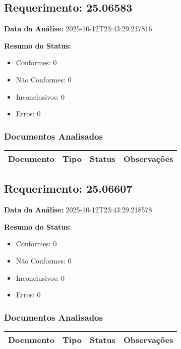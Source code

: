 \documentclass[12pt,a4paper]{article}
\begin{document}
\subsection{Requerimento: 25.06583}

\textbf{Data da Análise:} 2025-10-12T23:43:29.217816

\textbf{Resumo do Status:}
\begin{itemize}
    \item Conformes: 0
    \item Não Conformes: 0
    \item Inconclusivos: 0
    \item Erros: 0
\end{itemize}

\subsubsection{Documentos Analisados}

\begin{longtable}{|p{4cm}|p{2cm}|p{2cm}|p{6cm}|}
\hline
\textbf{Documento} & \textbf{Tipo} & \textbf{Status} & \textbf{Observações} \\
\hline
\endhead
\end{longtable}


\subsection{Requerimento: 25.06607}

\textbf{Data da Análise:} 2025-10-12T23:43:29.218578

\textbf{Resumo do Status:}
\begin{itemize}
    \item Conformes: 0
    \item Não Conformes: 0
    \item Inconclusivos: 0
    \item Erros: 0
\end{itemize}

\subsubsection{Documentos Analisados}

\begin{longtable}{|p{4cm}|p{2cm}|p{2cm}|p{6cm}|}
\hline
\textbf{Documento} & \textbf{Tipo} & \textbf{Status} & \textbf{Observações} \\
\hline
\endhead
\end{longtable}
\end{document}
